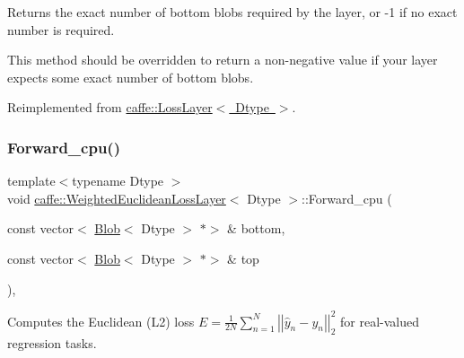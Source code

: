 Returns the exact number of bottom blobs required by the layer, or -\/1 if no exact number is required. 

This method should be overridden to return a non-\/negative value if your layer expects some exact number of bottom blobs. 

Reimplemented from \mbox{\hyperlink{classcaffe_1_1_loss_layer_af1620064baefb711e2c767bdc92b6fb1}{caffe\+::\+Loss\+Layer$<$ Dtype $>$}}.

\mbox{\label{classcaffe_1_1_weighted_euclidean_loss_layer_afec8ba4fe31b4b9581d58e9a829195aa}} 
\subsubsection{\texorpdfstring{Forward\+\_\+cpu()}{Forward\_cpu()}\hspace{0.1cm}{\footnotesize\ttfamily [1/2]}}
{\footnotesize\ttfamily template$<$typename Dtype $>$ \\
void \mbox{\hyperlink{classcaffe_1_1_weighted_euclidean_loss_layer}{caffe\+::\+Weighted\+Euclidean\+Loss\+Layer}}$<$ Dtype $>$\+::Forward\+\_\+cpu (\begin{DoxyParamCaption}\item[{const vector$<$ \mbox{\hyperlink{classcaffe_1_1_blob}{Blob}}$<$ Dtype $>$ $\ast$$>$ \&}]{bottom,  }\item[{const vector$<$ \mbox{\hyperlink{classcaffe_1_1_blob}{Blob}}$<$ Dtype $>$ $\ast$$>$ \&}]{top }\end{DoxyParamCaption})\hspace{0.3cm}{\ttfamily [protected]}, {\ttfamily [virtual]}}



Computes the Euclidean (L2) loss $ E = \frac{1}{2N} \sum\limits_{n=1}^N \left| \left| \hat{y}_n - y_n \right| \right|_2^2 $ for real-\/valued regression tasks. 


